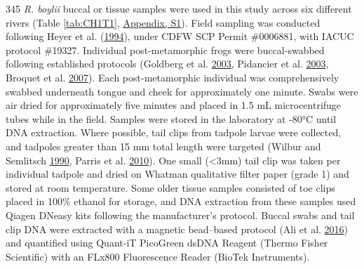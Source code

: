 \documentclass[proquest,12pt,final]{ucthesis-CA2012} %
\begin{document}
\begin{ucmainmatter}
345 \emph{R. boylii} buccal or tissue samples were used in this study
across six different rivers (Table \ref{tab:CH1T1},
\protect\hyperlink{supptables}{Appendix, S1}). Field sampling was
conducted following Heyer et al.
(\protect\hyperlink{ref-heyer_measuring_1994}{1994}), under CDFW SCP
Permit \#0006881, with IACUC protocol \#19327. Individual
post-metamorphic frogs were buccal-swabbed following established
protocols (Goldberg et al.
\protect\hyperlink{ref-goldberg_frogs_2003}{2003}, Pidancier et al.
\protect\hyperlink{ref-pidancier_buccal_2003}{2003}, Broquet et al.
\protect\hyperlink{ref-broquet_buccal_2007}{2007}). Each
post-metamorphic individual was comprehensively swabbed underneath
tongue and cheek for approximately one minute. Swabs were air dried for
approximately five minutes and placed in 1.5 mL microcentrifuge tubes
while in the field. Samples were stored in the laboratory at -80°C until
DNA extraction. Where possible, tail clips from tadpole larvae were
collected, and tadpoles greater than 15 mm total length were targeted
(Wilbur and Semlitsch
\protect\hyperlink{ref-wilbur_ecological_1990}{1990}, Parris et al.
\protect\hyperlink{ref-parris_assessing_2010}{2010}). One small
(\textless{}3mm) tail clip was taken per individual tadpole and dried on
Whatman qualitative filter paper (grade 1) and stored at room
temperature. Some older tissue samples consisted of toe clips placed in
100\% ethanol for storage, and DNA extraction from these samples used
Qiagen DNeasy kits following the manufacturer's protocol. Buccal swabs
and tail clip DNA were extracted with a magnetic bead--based protocol
(Ali et al. \protect\hyperlink{ref-ali_rad_2016}{2016}) and quantified
using Quant-iT PicoGreen dsDNA Reagent (Thermo Fisher Scientific) with
an FLx800 Fluorescence Reader (BioTek Instruments).
\begin{landscape}\begin{table}


\end{table}
\end{landscape}
\end{ucmainmatter}
\end{document}
